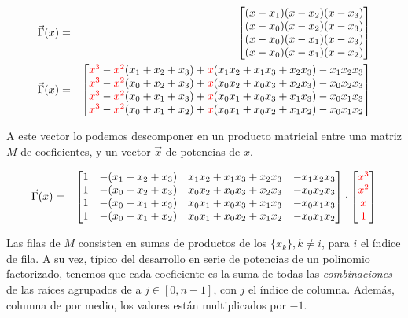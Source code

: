 \documentclass[12pt]{article}
\begin{document}
\begin{eqnarray*}
\vec{\Gamma}(x) &=& 
\begin{bmatrix}
    (x-x_1)(x-x_2)(x-x_3) \\
    (x-x_0)(x-x_2)(x-x_3) \\
    (x-x_0)(x-x_1)(x-x_3) \\
    (x-x_0)(x-x_1)(x-x_2)
\end{bmatrix}\\
\vec{\Gamma}(x) &=&
\begin{bmatrix}
    {\color{red}x^3} - {\color{red}x^2}(x_1+x_2+x_3) + {\color{red}x}(x_1 x_2 + x_1 x_3 + x_2 x_3) - x_1 x_2 x_3\\
    {\color{red}x^3} - {\color{red}x^2}(x_0+x_2+x_3) + {\color{red}x}(x_0 x_2 + x_0 x_3 + x_2 x_3) - x_0 x_2 x_3 \\
    {\color{red}x^3} - {\color{red}x^2}(x_0+x_1+x_3) + {\color{red}x}(x_0 x_1 + x_0 x_3 + x_1 x_3) - x_0 x_1 x_3 \\
    {\color{red}x^3} - {\color{red}x^2}(x_0+x_1+x_2) + {\color{red}x}(x_0 x_1 + x_0 x_2 + x_1 x_2) - x_0 x_1 x_2
\end{bmatrix}
\end{eqnarray*}

A este vector lo podemos descomponer en un producto matricial entre una matriz $M$ de coeficientes, y un vector $\vec{x}$ de potencias de $x$.


\begin{eqnarray*}
\vec{\Gamma}(x) &=& 
\begin{bmatrix}
    1 & -(x_1+x_2+x_3) & x_1 x_2 + x_1 x_3 + x_2 x_3 & - x_1 x_2 x_3 \\
    1 & -(x_0+x_2+x_3) & x_0 x_2 + x_0 x_3 + x_2 x_3 & - x_0 x_2 x_3 \\
    1 & -(x_0+x_1+x_3) & x_0 x_1 + x_0 x_3 + x_1 x_3 & - x_0 x_1 x_3 \\
    1 & -(x_0+x_1+x_2) & x_0 x_1 +  x_0 x_2 + x_1 x_2 & - x_0 x_1 x_2
\end{bmatrix}
\cdot
\begin{bmatrix}
\color{red} x^3\\
\color{red} x^2\\
\color{red} x\\
\color{red} 1\\
\end{bmatrix}
\end{eqnarray*}

Las filas de $M$ consisten en sumas de productos de los $\{x_k\}, k\neq i$, para $i$ el \'indice de fila. A su vez, t\'ipico del desarrollo en serie de potencias de un polinomio factorizado, tenemos que cada coeficiente es la suma de todas las \textit{combinaciones} de las ra\'ices agrupados de a $j \in [0,n-1]$, con $j$ el \'indice de columna. Adem\'as, columna de por medio, los valores est\'an multiplicados por $-1$.
\end{document}
